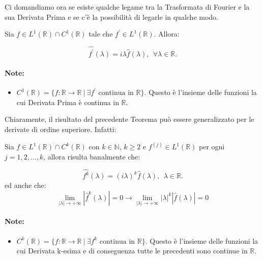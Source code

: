 Ci domandiamo ora se esiste qualche legame tra la Trasformata di Fourier e la
sua Derivata Prima e se c'è la possibilità di legarle in qualche modo.

\begin{theorem}
    Sia $f \in L^1(\mathbb{R}) \cap C^1(\mathbb{R})$ tale che $f^{\prime} \in
        L^1(\mathbb{R})$. Allora:
    
    $$
        \widehat{f^{\prime}}(\lambda) = i \lambda \hat{f}(\lambda), \ \ \forall
        \lambda \in \mathbb{R}.
    $$
\end{theorem}

\paragraph{Note:}
\begin{itemize}
    \item $C^1(\mathbb{R}) = \{ f: \mathbb{R} \rightarrow \mathbb{R} \ | \
              \exists f^{\prime} \text{ continua in } \mathbb{R} \}$. Questo è
          l'insieme delle funzioni la cui Derivata Prima è continua in
          $\mathbb{R}$.
\end{itemize}

Chiaramente, il risultato del precedente Teorema può essere generalizzato per le
derivate di ordine superiore. Infatti:

\begin{theorem}
    Sia $f \in L^1(\mathbb{R}) \cap C^k(\mathbb{R})$ con $k \in \mathbb{N}$, $k
        \geq 2$ e $f^{\left(j\right)} \in L^1(\mathbb{R})$ per ogni $j = 1, 2,
        \ldots, k$, allora risulta banalmente che:
    
    $$
        \widehat{f^k}(\lambda) = (i \lambda)^k \hat{f}(\lambda), \ \ \lambda \in
        \mathbb{R}.
    $$
    ed anche che:
    $$
        \lim_{ |\lambda| \rightarrow +\infty } \left| \hat{f}^k(\lambda) \right| = 0 \rightarrow
        \lim_{ |\lambda| \rightarrow +\infty } \left|\lambda\right|^k\left| \hat{f}(\lambda) \right| = 0
    $$
\end{theorem}

\paragraph{Note:}
\begin{itemize}
    \item $C^k(\mathbb{R}) = \{ f: \mathbb{R} \rightarrow \mathbb{R} \ | \
              \exists f^{k} \text{ continua in } \mathbb{R} \}$. Questo è
          l'insieme delle funzioni la cui Derivata k-esima e di conseguenza tutte le precedenti sono continue in
          $\mathbb{R}$.
\end{itemize}

